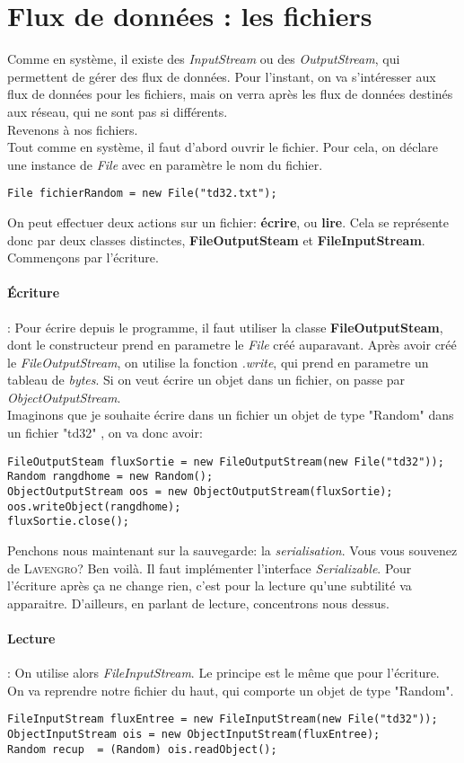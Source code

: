 \documentclass{article}
\begin{document}
\section{Flux de données : les fichiers}
Comme en système, il existe des \emph{InputStream} ou des \emph{OutputStream}, qui permettent de gérer des flux de données. Pour l'instant, on va s'intéresser aux flux de données pour les fichiers, mais on verra après les flux de données destinés aux réseau, qui ne sont pas si différents.\\
Revenons à nos fichiers. \\
Tout comme en système, il faut d'abord ouvrir le fichier. Pour cela, on déclare une instance de \emph{File} avec en paramètre le nom du fichier.
\begin{lstlisting}
File fichierRandom = new File("td32.txt");
\end{lstlisting}
On peut effectuer deux actions sur un fichier: \textbf{écrire}, ou \textbf{lire}. Cela se représente donc par deux classes distinctes, \textbf{FileOutputSteam} et \textbf{FileInputStream}.\\
Commençons par l'écriture.
\paragraph{Écriture} : Pour écrire depuis le programme, il faut utiliser la classe \textbf{FileOutputSteam}, dont le constructeur prend en parametre le \emph{File} créé auparavant. Après avoir créé le \emph{FileOutputStream}, on utilise la fonction \emph{.write}, qui prend en parametre un tableau de \emph{bytes}. Si on veut écrire un objet dans un fichier,  on passe par  \emph{ObjectOutputStream}.\\
Imaginons que je souhaite écrire dans un fichier un objet de type "Random" dans un fichier "td32" , on va donc avoir:
\begin{lstlisting}
FileOutputSteam fluxSortie = new FileOutputStream(new File("td32"));
Random rangdhome = new Random();
ObjectOutputStream oos = new ObjectOutputStream(fluxSortie);
oos.writeObject(rangdhome);
fluxSortie.close();
\end{lstlisting}
Penchons nous maintenant sur la sauvegarde: la \emph{serialisation}. Vous vous souvenez de \textsc{Lavengro}? Ben voilà. Il faut implémenter l'interface \emph{Serializable}. Pour l'écriture après ça ne change rien, c'est pour la lecture qu'une subtilité va apparaitre. D'ailleurs, en parlant de lecture, concentrons nous dessus.
\paragraph{Lecture} : On utilise alors \emph{FileInputStream}. Le principe est le même que pour l'écriture. On va reprendre notre fichier du haut, qui comporte un objet de type "Random". 
\begin{lstlisting}
FileInputStream fluxEntree = new FileInputStream(new File("td32"));
ObjectInputStream ois = new ObjectInputStream(fluxEntree);
Random recup  = (Random) ois.readObject();
\end{lstlisting}
\end{document}
